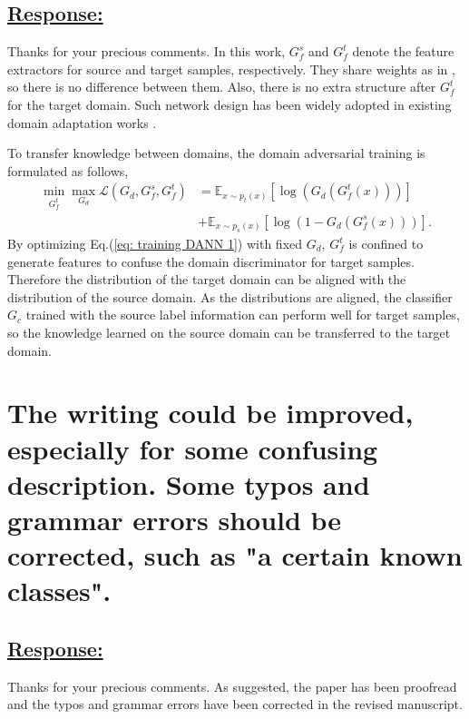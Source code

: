 \subsection*{\underline{\textbf{Response:}}}

Thanks for your precious comments.
In this work, $G_f^s$ and $G_f^t$ denote the feature extractors for source and target samples, respectively. 
They share weights as in \cite{OpensetDA-bp}, so there is no difference between them. 
Also, there is no extra structure after $G_f^t$ for the target domain.
Such network design has been widely adopted in existing domain adaptation works \cite{OpensetDA-bp,PartialDA-tf,UniversalDomainAdaptation}.

To transfer knowledge between domains, the domain adversarial training is formulated as follows,
\begin{equation}
    \label{eq: training DANN 1}
    \begin{split}
        \min_{G_f^t} \max_{G_d} \mathscr{L}(G_d,G^{s}_{f},G_f^t) &=\mathbb{E}_{x\sim p_t(x)} \left[ \log \left(G_d\left(G_f^t\left(x\right)\right)\right) \right]\\
        &+\mathbb{E}_{x\sim p_s(x)}\left[ \log \left(1-G_d\left(G_f^s\left(x\right)\right)\right) \right].
    \end{split}
\end{equation}
By optimizing Eq.(\ref{eq: training DANN 1}) with fixed $G_d$, $G_f^t$ is confined to generate features to confuse the domain discriminator for target samples.
Therefore the distribution of the target domain can be aligned with the distribution of the source domain.
As the distributions are aligned, the classifier $G_c$ trained with the source label information can perform well for target samples, so the knowledge learned on the source domain can be transferred to the target domain.


\section{The writing could be improved, especially for some confusing description.
Some typos and grammar errors should be corrected, such as "a certain known classes".}

\subsection*{\underline{\textbf{Response:}}}

Thanks for your precious comments.
As suggested, the paper has been proofread and the typos and grammar errors have been corrected in the revised manuscript.
